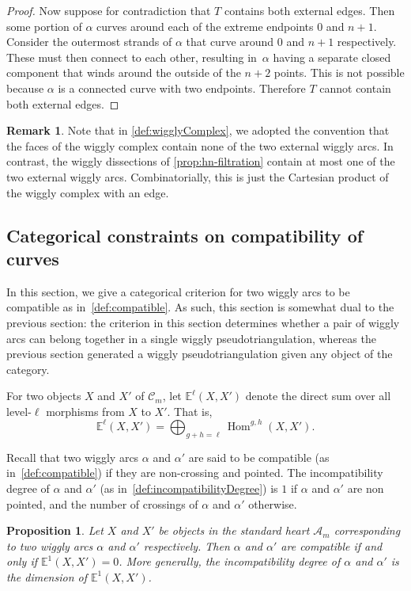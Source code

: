 \documentclass{amsart}
\newtheorem{proposition}[theorem]{Proposition}
\theoremstyle{definition}
\newtheorem{remark}[theorem]{Remark}
\DeclareMathOperator{\Hom}{Hom} %
\begin{document}
\begin{proof}
  Now suppose for contradiction that \(T\) contains both external edges.
  Then some portion of \(\alpha\) curves around each of the extreme endpoints \(0\) and \(n+1\).
  Consider the outermost strands of \(\alpha\) that curve around \(0\) and \(n+1\) respectively.
  These must then connect to each other, resulting in~\(\alpha\) having a separate closed component that winds around the outside of the \(n+2\) points.
  This is not possible because \(\alpha\) is a connected curve with two endpoints.
  Therefore \(T\) cannot contain both external edges.
\end{proof}

\begin{remark}
Note that in \cref{def:wigglyComplex}, we adopted the convention that the faces of the wiggly complex contain none of the two external wiggly arcs.
In contrast, the wiggly dissections of \cref{prop:hn-filtration} contain at most one of the two external wiggly arcs.
Combinatorially, this is just the Cartesian product of the wiggly complex with an edge.
\end{remark}


\subsection{Categorical constraints on compatibility of curves}
\label{subsec:categoricalCompatibility}

In this section, we give a categorical criterion for two wiggly arcs to be compatible as in~\cref{def:compatible}.
As such, this section is somewhat dual to the previous section: the criterion in this section determines whether a pair of wiggly arcs can belong together in a single wiggly pseudotriangulation, whereas the previous section generated a wiggly pseudotriangulation given any object of the category.

For two objects \(X\) and \(X'\) of \(\mathcal{C}_m\), let \(\mathbb{E}^\ell(X,X')\) denote the direct sum over all level-\(\ell\) morphisms from \(X\) to \(X'\).
That is,
\[\mathbb{E}^\ell(X,X') = \bigoplus_{g + h = \ell}\Hom^{g,h}(X,X').\]

Recall that two wiggly arcs \(\alpha\) and \(\alpha'\) are said to be compatible (as in~\cref{def:compatible}) if they are non-crossing and pointed.
The incompatibility degree of \(\alpha\) and \(\alpha'\) (as in~\cref{def:incompatibilityDegree}) is \(1\) if \(\alpha\) and \(\alpha'\) are non pointed, and the number of crossings of \(\alpha\) and \(\alpha'\) otherwise.
\begin{proposition}
\label{prop:ext1}
Let \(X\) and \(X'\) be objects in the standard heart \(\mathcal{A}_m\) corresponding to two wiggly arcs \(\alpha\) and \(\alpha'\) respectively.
  Then \(\alpha\) and \(\alpha'\) are compatible if and only if \(\mathbb{E}^1(X, X') = 0\).
  More generally, the incompatibility degree of \(\alpha\) and \(\alpha'\) is the dimension of \(\mathbb{E}^1(X,X')\).
\end{proposition}
\end{document}
